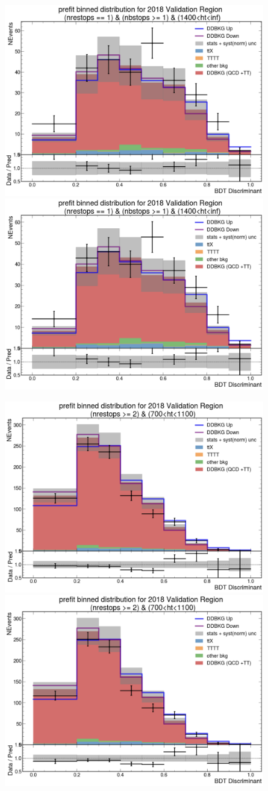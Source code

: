 \documentclass[twoside]{article}
\begin{document}
\begin{figure}[!t]
    \centering
    \includegraphics[width=.45\columnwidth]{plots/Trigger/TriggerReview/eff10.png}
    \includegraphics[width=.45\columnwidth]{plots/Trigger/TriggerReview/SF10.png}

    \includegraphics[width=.45\columnwidth]{plots/Trigger/TriggerReview/eff11.png}
    \includegraphics[width=.45\columnwidth]{plots/Trigger/TriggerReview/SF11.png}


\end{figure}
\end{document}
